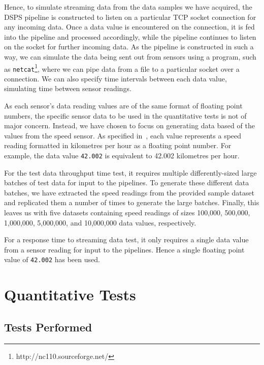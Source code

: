 Hence, to simulate streaming data from the data samples we have acquired, the DSPS pipeline is constructed to listen on
a particular TCP socket connection for any incoming data. Once a data value is encountered on the connection, it is fed into
the pipeline and processed accordingly, while the pipeline continues to listen on the socket for further incoming data.
As the pipeline is constructed in such a way, we can simulate the data being sent out from sensors using a program, such
as \texttt{netcat}\footnote{http://nc110.sourceforge.net/}, where we can pipe data from a file to a particular
socket over a connection. We can also specify time intervals between each data value, simulating time between sensor readings.

As each sensor's data reading values are of the same format of floating point numbers,
the specific sensor data to be used in the quantitative tests is not of major concern. Instead, we have chosen to focus on
generating data based of the values from the speed sensor. As specified in~, each value represents
a speed reading formatted in kilometres per hour as a floating point number. For example, the data value \texttt{42.002}
is equivalent to 42.002 kilometres per hour.

For the test data throughput time test, it requires multiple differently-sized large batches of test data for input
to the pipelines. To generate these different data batches, we have extracted the speed readings from the provided sample dataset
and replicated them a number of times to generate the large batches. Finally, this leaves us with five datasets containing
speed readings of sizes 100,\@000, 500,\@000, 1,\@000,\@000, 5,\@000,\@000, and 10,\@000,\@000 data values, respectively.

For a response time to streaming data test, it only requires a single data value from a sensor reading for input to the
pipelines. Hence a single floating point value of \texttt{42.002} has been used.



\section{Quantitative Tests} %
\label{sub:quantitative_tests}

\subsection{Tests Performed} %
\label{ssub:quan_tests_performed}

